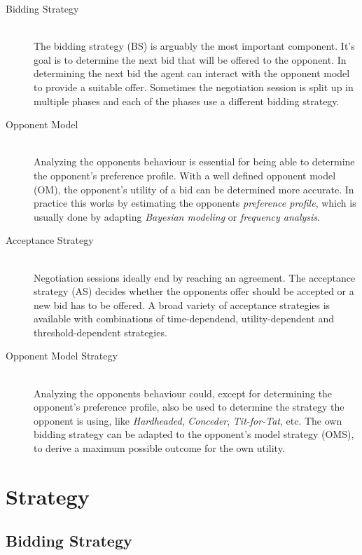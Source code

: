 \documentclass[a4paper,10pt]{article}
\begin{document}
\begin{description}
  \item[Bidding Strategy] \hfill \\
  The bidding strategy (BS) is arguably the most important component. It's goal is to determine the next bid that will be offered to the opponent. In determining the next bid the agent can interact with the opponent model to provide a suitable offer. Sometimes the negotiation session is split up in multiple phases and each of the phases use a different bidding strategy.

  \item[Opponent Model] \hfill \\
  Analyzing the opponents behaviour is essential for being able to determine the opponent's preference profile.  With a well defined opponent model (OM), the opponent's utility of a bid can be determined more accurate. In practice this works by estimating the opponents \emph{preference profile}, which is usually done by adapting \emph{Bayesian modeling} or \emph{frequency analysis}. 

  \item[Acceptance Strategy] \hfill \\
  Negotiation sessions ideally end by reaching an agreement. The acceptance strategy (AS) decides whether the opponents offer should be accepted or a new bid has to be offered. A broad variety of acceptance strategies is available with combinations of time-dependend, utility-dependent and threshold-dependent strategies.

\item[Opponent Model Strategy] \hfill \\
  Analyzing the opponents behaviour could, except for determining the opponent's preference profile, also be used to determine the strategy the opponent is using, like \emph{Hardheaded}, \emph{Conceder}, \emph{Tit-for-Tat}, etc. The own bidding strategy can be adapted to the opponent's model strategy (OMS), to derive a maximum possible outcome for the own utility.

\end{description}

\section{Strategy}
\label{sec:strategy}

\subsection{Bidding Strategy}
\label{sec:strategyBS}

\end{document}
